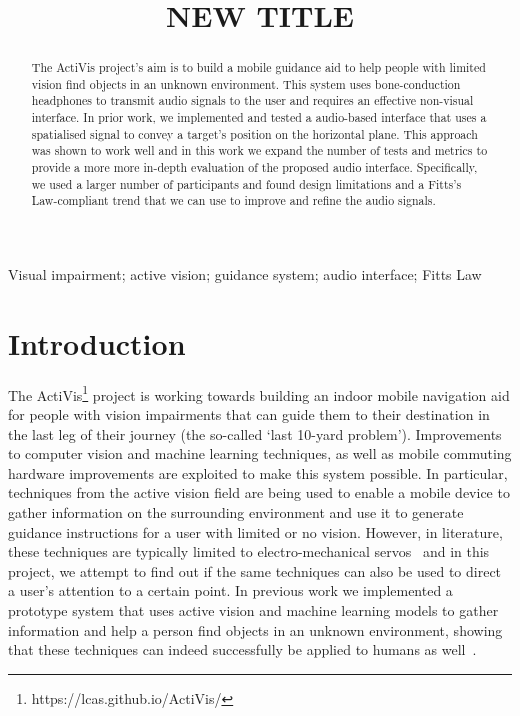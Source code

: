 \documentclass[]{interact}
\begin{document}

\title{NEW TITLE}

\author{%
}

\maketitle

\begin{abstract}
  The ActiVis project's aim is to build a mobile guidance aid to help people with limited vision find objects in an unknown environment.
  This system uses bone-conduction headphones to transmit audio signals to the user and requires an effective non-visual interface.
  In prior work, we implemented and tested a audio-based interface that uses a spatialised signal to convey a target's position on the horizontal plane. 
  This approach was shown to work well and in this work we expand the number of tests and metrics to provide a more more in-depth evaluation of the proposed audio interface.
  Specifically, we used a larger number of participants and found design limitations and a Fitts's Law-compliant trend that we can use to improve and refine the audio signals. 
\end{abstract}

\begin{keywords}
  Visual impairment; active vision; guidance system; audio interface; Fitts Law
\end{keywords}

\section{Introduction}

The ActiVis\footnote{https://lcas.github.io/ActiVis/} project is working towards building an indoor mobile navigation aid for people with vision impairments that can guide them to their destination in the last leg of their journey (the so-called `last 10-yard problem').
Improvements to computer vision and machine learning techniques, as well as mobile commuting hardware improvements are exploited to make this system possible.
In particular, techniques from the active vision field are being used to enable a mobile device to gather information on the surrounding environment and use it to generate guidance instructions for a user with limited or no vision.
However, in literature, these techniques are typically limited to electro-mechanical servos~\citep{bajcsy2018revisiting} and in this project, we attempt to find out if the same techniques can also be used to direct a user's attention to a certain point. 
In previous work we implemented a prototype system that uses active vision and machine learning models to gather information and help a person find objects in an unknown environment, showing that these techniques can indeed successfully be applied to humans as well~\citep{lock2019active}.
\end{document}
